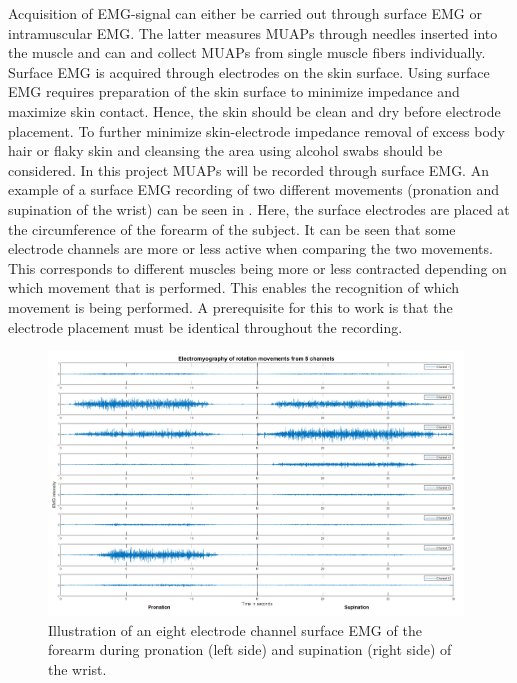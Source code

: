 Acquisition of EMG-signal can either be carried out through surface EMG or intramuscular EMG. The latter measures MUAPs through needles inserted into the muscle and can and collect MUAPs from single muscle fibers individually. Surface EMG is acquired through electrodes on the skin surface. \cite{Cram2012}  Using surface EMG requires preparation of the skin surface to minimize impedance and maximize skin contact. Hence, the skin should be clean and dry before electrode placement. To further minimize skin-electrode impedance removal of excess body hair or flaky skin and cleansing the area using alcohol swabs should be considered. \cite{Turker2013,Cram2012} In this project MUAPs will be recorded through surface EMG. An example of a surface EMG recording of two different movements (pronation and supination of the wrist) can be seen in . Here, the surface electrodes are placed at the circumference of the forearm of the subject. It can be seen that some electrode channels are more or less active when comparing the two movements. This corresponds to different muscles being more or less contracted depending on which movement that is performed. This enables the recognition of which movement is being performed. A prerequisite for this to work is that the electrode placement must be identical throughout the recording.

\begin{figure}[H]                 
	\includegraphics[width=0.98\textwidth]{figures/Emg_rot}  
	\caption{Illustration of an eight electrode channel surface EMG of the forearm during pronation (left side) and supination (right side) of the wrist.}
	\label{fig:Emg_rot} 
\end{figure}

